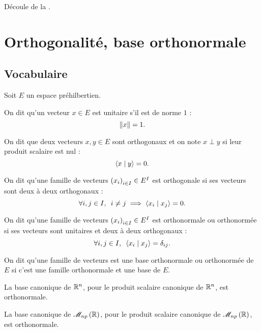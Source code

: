 \begin{dem}
Découle de la .
\end{dem}

\section{Orthogonalité, base orthonormale}

\subsection{Vocabulaire}

\begin{defi}
Soit \(E\) un espace préhilbertien.

On dit qu'un vecteur \(x\in E\) est unitaire s'il est de norme \(1\) : \[\left\|x\right\|=1.\]

On dit que deux vecteurs \(x,y\in E\) sont orthogonaux et on note \(x\perp y\) si leur produit scalaire est nul : \[\left\langle x\;\middle|\; y\right\rangle=0.\]

On dit qu'une famille de vecteurs \(\left(x_i\right)_{i\in I}\in E^I\) est orthogonale si ses vecteurs sont deux à deux orthogonaux : \[\quantifs{\forall i,j\in I}i\not=j\imp\ps{x_i}{x_j}=0.\]

On dit qu'une famille de vecteurs \(\left(x_i\right)_{i\in I}\in E^I\) est orthonormale ou orthonormée si ses vecteurs sont unitaires et deux à deux orthogonaux : \[\quantifs{\forall i,j\in I}\ps{x_i}{x_j}=\delta_{ij}.\]

On dit qu'une famille de vecteurs est une base orthonormale ou orthonormée de \(E\) si c'est une famille orthonormale et une base de \(E\).
\end{defi}

\begin{ex}
La base canonique de \(\mathbb{R}^n\), pour le produit scalaire canonique de \(\mathbb{R}^n\), est orthonormale.

La base canonique de \(\M{np}[\R]\), pour le produit scalaire canonique de \(\M{np}[\R]\), est orthonormale.
\end{ex}

